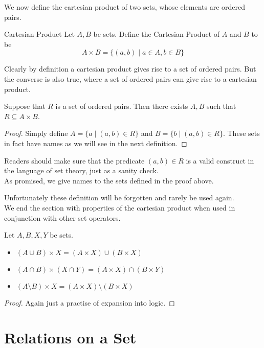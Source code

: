 \documentclass[a4paper]{article}
\begin{document}
We now define the cartesian product of two sets, whose elements are ordered pairs. 

\begin{defn}{Cartesian Product}{} Let $A,B$ be sets. Define the Cartesian Product of $A$ and $B$ to be $$A\times B=\{(a,b)\;|\;a\in A, b\in B\}$$
\end{defn}

Clearly by definition a cartesian product gives rise to a set of ordered pairs. But the converse is also true, where a set of ordered pairs can give rise to a cartesian product. 

\begin{prp}{}{} Suppose that $R$ is a set of ordered pairs. Then there exists $A,B$ such that $R\subseteq A\times B$. 
\begin{proof}
Simply define $A=\{a\;|\;(a,b)\in R\}$ and $B=\{b\;|\;(a,b)\in R\}$. These sets in fact have names as we will see in the next definition. 
\end{proof}
\end{prp}

Readers should make sure that the predicate $(a,b)\in R$ is a valid construct in the language of set theory, just as a sanity check. \\
As promised, we give names to the sets defined in the proof above. 

Unfortunately these definition will be forgotten and rarely be used again. \\
We end the section with properties of the cartesian product when used in conjunction with other set operators. 

\begin{prp}{}{} Let $A,B,X,Y$ be sets. 
\begin{itemize}
\item $(A\cup B)\times X=(A\times X)\cup(B\times X)$
\item $(A\cap B)\times (X\cap Y)=(A\times X)\cap(B\times Y)$
\item $(A\setminus B)\times X=(A\times X)\setminus(B\times X)$
\end{itemize}
\begin{proof} Again just a practise of expansion into logic. 
\end{proof}
\end{prp}

\pagebreak
\section{Relations on a Set}
\end{document}
